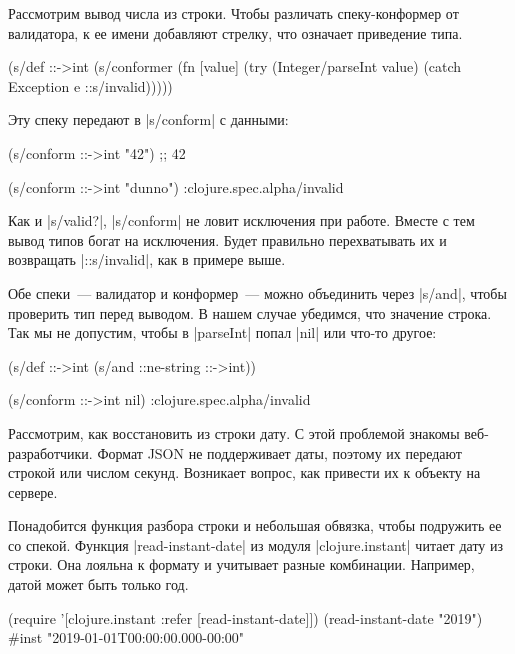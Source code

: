 Рассмотрим вывод числа из строки. Чтобы различать спеку-конформер от валидатора,
к ее имени добавляют стрелку, что означает приведение типа.

\begin{english}
  \begin{clojure}
(s/def ::->int
  (s/conformer
   (fn [value]
     (try
       (Integer/parseInt value)
       (catch Exception e
         ::s/invalid)))))
  \end{clojure}
\end{english}

Эту спеку передают в \spverb|s/conform| с данными:

\begin{english}
  \begin{clojure}
(s/conform ::->int "42") ;; 42

(s/conform ::->int "dunno")
:clojure.spec.alpha/invalid
  \end{clojure}
\end{english}

Как и \spverb|s/valid?|, \spverb|s/conform| не ловит исключения при
работе. Вместе с тем вывод типов богат на исключения. Будет правильно
перехватывать их и возвращать \spverb|::s/invalid|, как в примере выше.

Обе спеки~--- валидатор и конформер~--- можно объединить через \spverb|s/and|,
чтобы проверить тип перед выводом. В нашем случае убедимся, что значение
строка. Так мы не допустим, чтобы в \spverb|parseInt| попал \spverb|nil| или
что-то другое:

\begin{english}
  \begin{clojure}
(s/def ::->int
  (s/and ::ne-string ::->int))

(s/conform ::->int nil)
:clojure.spec.alpha/invalid
  \end{clojure}
\end{english}

Рассмотрим, как восстановить из строки дату. С этой проблемой знакомы
веб-разработчики. Формат JSON не поддерживает даты, поэтому их передают строкой
или числом секунд. Возникает вопрос, как привести их к объекту на сервере.

Понадобится функция разбора строки и небольшая обвязка, чтобы подружить ее со
спекой. Функция \spverb|read-instant-date| из модуля \spverb|clojure.instant|
читает дату из строки. Она лояльна к формату и учитывает разные
комбинации. Например, датой может быть только год.

\begin{english}
  \begin{clojure}
(require '[clojure.instant :refer [read-instant-date]])
(read-instant-date "2019")
#inst "2019-01-01T00:00:00.000-00:00"
  \end{clojure}
\end{english}

